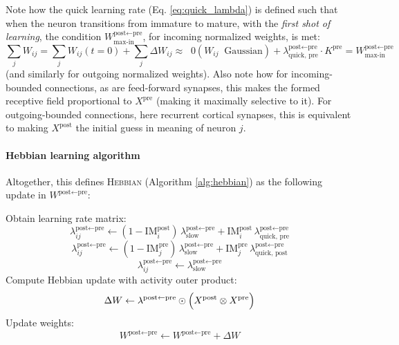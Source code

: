 \documentclass{article}
\begin{document}
Note how the quick learning rate (Eq. \eqref{eq:quick_lambda}) is defined such that when the neuron transitions from immature to mature, with the  \textit{first shot of learning}, the condition $W^{\textrm{post}\leftarrow\textrm{pre}}_\textrm{max-in}$, for incoming normalized weights, is met:
\begin{equation}
    \sum_j W_{ij} = \sum_j W_{ij}(t = 0) + \sum_j \Delta W_{ij} \approx \;\; 0 (W_{ij} \;\; \textrm{Gaussian})  +\lambda^{\textrm{post}\leftarrow\textrm{pre}}_\textrm{quick, pre}\cdot K^\textrm{pre} = W^{\textrm{post}\leftarrow\textrm{pre}}_\textrm{max-in}
\end{equation}
(and similarly for outgoing normalized weights). Also note how for incoming-bounded connections, as are feed-forward synapses, this makes the formed receptive field proportional to $X^\textrm{pre}$ (making it maximally selective to it). For outgoing-bounded connections, here recurrent cortical synapses, this is equivalent to making $X^\textrm{post}$ the initial guess in meaning of neuron $j$.
\paragraph*{Hebbian learning algorithm}
Altogether, this defines \textsc{Hebbian} (Algorithm \ref{alg:hebbian}) as the following update in $W^{\textrm{post} \leftarrow \textrm{pre}}$:
\begin{algorithm}
\caption{Hebbian Learning}\label{alg:hebbian}
\begin{algorithmic}[1]
    \State Obtain learning rate matrix:
        \State \Return
    \EndIf
        \[
            \lambda_{ij}^{\textrm{post} \leftarrow \textrm{pre}}
            \gets
            (1-\textrm{IM}^\textrm{post}_i)\,\lambda^{\textrm{post} \leftarrow \textrm{pre}}_\textrm{slow}
            + \textrm{IM}^\textrm{post}_i\,\lambda^{\textrm{post}\leftarrow\textrm{pre}}_{\textrm{quick, pre}}
        \]
        \[
            \lambda_{ij}^{\textrm{post} \leftarrow \textrm{pre}}
            \gets
            (1-\textrm{IM}^\textrm{pre}_j)\,\lambda^{\textrm{post} \leftarrow \textrm{pre}}_\textrm{slow}
            + \textrm{IM}^\textrm{pre}_j\,\lambda^{\textrm{post}\leftarrow\textrm{pre}}_{\textrm{quick, post}}
        \]
    \Else
        \[
            \lambda_{ij}^{\textrm{post} \leftarrow \textrm{pre}} 
            \gets 
            \lambda^{\textrm{post}\leftarrow\textrm{pre}}_\textrm{slow}
        \]
    \EndIf
    \State Compute Hebbian update with activity outer product:
        \[
            \Delta W \gets \lambda^{\textrm{post} \leftarrow \textrm{pre}} \odot 
            \Bigl(X^{\textrm{post}} \otimes X^{\textrm{pre}}\Bigr)
        \]
    \State Update weights:
        \[
            W^{\textrm{post} \leftarrow \textrm{pre}} 
            \gets 
            W^{\textrm{post} \leftarrow \textrm{pre}} + \Delta W
        \]
\EndFunction
\end{algorithmic}
\end{algorithm}
\end{document}
